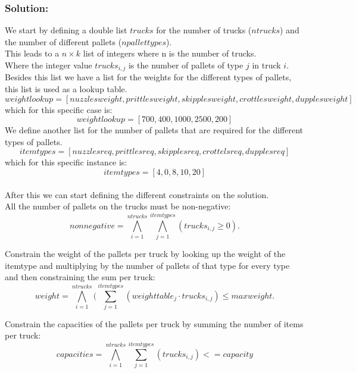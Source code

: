 \documentclass[12pt]{article}
\begin{document}
\vspace{8mm}

\newpage

\subsubsection*{Solution:}

We start by defining a double list $trucks$ for the number of trucks ($ntrucks$) and the number of different pallets ($npallettypes$). \\
This leads to a $n \times k$ list of integers where n is the number of trucks. \\
 Where the integer value $ trucks_{i,j} $ is the number of pallets of type $j$ in truck $i$. \\

Besides this list we have a list for the weights for the different types of pallets, this list is used as a lookup table. \\
\[ weightlookup = [nuzzlesweight, prittlesweight, skipplesweight, crottlesweight, dupplesweight] \]
which for this specific case is:
\[ weightlookup = [700, 400, 1000, 2500, 200] \]
We define another list for the number of pallets that are required for the different types of pallets.\\
\[ itemtypes = [nuzzlesreq, prittlesreq, skipplesreq, crottelsreq, dupplesreq] \]
which for this specific instance is:
\[ itemtypes = [4, 0, 8, 10, 20] \] \\

After this we can start defining the different constraints on the solution.\\

All the number of pallets on the trucks must be non-negative: \\
\[ nonnegative = \bigwedge_{i=1}^{ntrucks} \bigwedge_{j=1}^{itemtypes} (trucks_{i,j} \geq 0). \]

Constrain the weight of the pallets per truck by looking up the weight of the itemtype and multiplying by the number of pallets of that type for every type and then constraining the sum per truck: \\
\[ weight = \bigwedge_{i=1}^{ntrucks} ( \sum_{j=1}^{itemtypes} (weighttable_j \cdot trucks_{i,j} ) \leq maxweight. \]

Constrain the capacities of the pallets per truck by summing the number of items per truck: \\
\[ capacities = \bigwedge_{i=1}^{ntrucks} \sum_{j=1}^{itemtypes} ( trucks_{i,j} ) <= capacity \]
\end{document}
